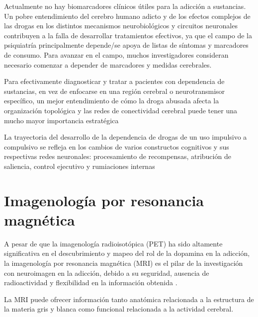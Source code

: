 Actualmente no hay biomarcadores clínicos útiles para la adicción a sustancias. Un pobre entendimiento del cerebro humano adicto y de los efectos complejos de las drogas en los distintos mecanismos neurobiológicos y circuitos neuronales contribuyen a la falla de desarrollar tratamientos efectivos, ya que el campo de la psiquiatría principalmente depende/se apoya de listas de síntomas y marcadores de consumo. Para avanzar en el campo, muchos investigadores consideran necesario comenzar a depender de marcadores y medidas cerebrales.

Para efectivamente diagnosticar y tratar a pacientes con dependencia de sustancias, en vez de enfocarse en una región cerebral o neurotransmisor específico, un mejor entendimiento de cómo la droga abusada afecta la organización topológica y las redes de conectividad cerebral puede tener una mucho mayor importancia estratégica %

La trayectoria del desarrollo de la dependencia de drogas de un uso impulsivo a compulsivo se refleja en los cambios de varios constructos cognitivos y sus respectivas redes neuronales: procesamiento de recompensas, atribución de saliencia, control ejecutivo y rumiaciones internas





















\section{Imagenología por resonancia magnética}
A pesar de que la imagenología radioisotópica (PET) ha sido altamente significativa en el descubrimiento y mapeo del rol de la dopamina en la adicción, la imagenología por resonancia magnética (MRI) es el pilar de la investigación con neuroimagen en la adicción, debido a su seguridad, ausencia de radioactividad y flexibilidad en la información obtenida \parencite{Suckling2017}. \par
La MRI puede ofrecer información tanto anatómica \textemdash{}relacionada a la estructura de la materia gris y blanca\textemdash{} como funcional \textemdash{}relacionada a la actividad cerebral.


